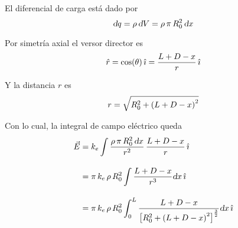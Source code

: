 \begin{mdframed}[style=ExampleFrame]

    El diferencial de carga está dado por
    \begin{equation*}
        \textsl{d} q = \rho \, \textsl{d} V
        = \rho \, \pi \, R_0^2 \, \textsl{d} x
    \end{equation*}

    Por simetría axial el versor director es
    \begin{equation*}
        \hat{r} = \cos(\theta) \, \hat{\imath}
        = \frac{L+D-x}{r} \, \hat{\imath}
    \end{equation*}

    Y la distancia $r$ es
    \begin{equation*}
        r = \sqrt{R_0^2 + \left(L+D-x\right)^2}
    \end{equation*}

    Con lo cual, la integral de campo eléctrico queda
    \begin{align*}
        \vec{E} &= k_e \int \frac{\rho \, \pi \, R_0^2 \, \textsl{d} x}{r^2} \, \frac{L+D-x}{r} \, \hat{\imath}
        \\[1em]
        &= \pi \, k_e \, \rho \, R_0^2 \int \frac{L+D-x}{r^3} \textsl{d} x \, \hat{\imath}
        \\[1em]
        &= \pi \, k_e \, \rho \, R_0^2 \int_0^L \frac{L+D-x}{{ \begin{bmatrix} R_0^2 + \left(L+D-x\right)^2 \end{bmatrix} }^{\frac{3}{2}}} \textsl{d} x \, \hat{\imath}
    \end{align*}
\end{mdframed}

